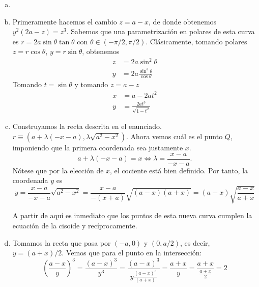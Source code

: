 \documentclass[twoside]{article}
\begin{document}
\begin{solucion}
\begin{enumerate}[a.]
\item[]
\item Primeramente hacemos el cambio $z=a-x$, de donde obtenemos $y^2(2a-z)=z^3$. Sabemos que una parametrización en polares de esta curva es $ r=2a\sin \theta \tan \theta$ con $\theta\in(-\pi/2,\pi/2)$. Clásicamente, tomando polares $z=r\cos \theta$, $y=r\sin \theta$, obtenemos
\begin{align*}
z&=2a\sin^2\theta\\
y&= 2a\frac{\sin^3\theta}{\cos \theta}
\end{align*}
Tomando $t = \sin \theta$ y tomando $z=a-z$
\begin{align*}
x&=a-2at^2\\
y&=\frac{2at^3}{\sqrt{1-t^2}}
\end{align*}

\item  Construyamos la recta descrita en el enunciado. $r\equiv (a+\lambda (-x-a),\lambda\sqrt{a^2-x^2})$. Ahora vemos cuál es el punto $Q$, imponiendo que la primera coordenada sea justamente $x$.
\[
a+\lambda (-x-a)=x\Leftrightarrow \lambda=\frac{x-a}{-x-a}.
\]
Nótese que por la elección de $x$, el cociente está bien definido. Por tanto, la coordenada $y$ es
\[
y=\frac{x-a}{-x-a}\sqrt{a^2-x^2}=\frac{x-a}{-(x+a)}\sqrt{(a-x)(a+x)}=(a-x)\sqrt{\frac{a-x}{a+x}}
\]

A partir de aquí es inmediato que los puntos de esta nueva curva cumplen la ecuación de la cisoide y recíprocamente.

\item Tomamos la recta que pasa por $(-a,0)$ y $(0,a/2)$, es decir, $y=(a+x)/2$. Vemos que para el punto en la intersección:
\[ \left(\frac{a-x}{y}\right)^3 = \frac{(a-x)^3}{y^3} = \frac{(a-x)^3}{y\frac{(a-x)^3}{(a+x)}} = \frac{a+x}{y} = \frac{a+x}{\frac{a+x}{2}} = 2 \]
\end{enumerate}
\end{solucion}

\newpage
\end{document}
